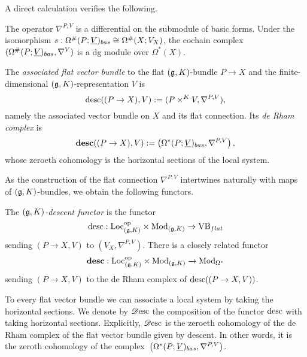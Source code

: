 A direct calculation verifies the following. 

\begin{lemma} 
The operator $\nabla^{P,V}$ is a differential on the submodule of basic forms.
Under the isomorphism $s: \Omega^{\#}(P; \underline{V})_{bas} \cong \Omega^{\#}(X;
V_X)$, the cochain complex $(\Omega^{\#}(P; \underline{V})_{bas}, \nabla^V)$ is a
dg module over $\Omega^*(X)$. 
\end{lemma}


\begin{dfn}\label{def desc}
The {\em associated flat vector bundle} to the flat $(\mathfrak g,K)$-bundle $P \to X$ and the finite-dimensional $(\mathfrak g,K)$-representation $V$ is 
\[
{\rm desc}((P\to X),V) := (P \times^K V, \nabla^{P,V}),
\]
namely the associated vector bundle on $X$ and its flat connection.
Its {\em de Rham complex} is
\[
\mathbf{desc}((P \to X), V) := \left(\Omega^*(P; \underline{V})_{bas}, \nabla^{P,V}\right),
\]
whose zeroeth cohomology is the horizontal sections of the local system.
\end{dfn}

As the construction of the flat connection $\nabla^{P,V}$ intertwines naturally with maps of $(\mathfrak g,K)$-bundles, 
we obtain the following functors.

\begin{dfn}
The {\em $(\mathfrak g,K)$-descent functor} is the functor 
\[
{\rm desc}: {\rm Loc}_{(\mathfrak g,K)}^{{\rm op}} \times {\rm Mod}_{(\mathfrak g,K)} \to {\rm VB}_{flat}
\]
sending $(P \to X, V)$ to $(V_X,\nabla^{P,V})$.
There is a closely related functor
\[
\mathbf{desc}: {\rm Loc}_{(\mathfrak g,K)}^{{\rm op}} \times {\rm Mod}_{(\mathfrak g,K)} \to {\rm Mod}_{\Omega^*}
\]
sending $(P \to X, V)$ to the de Rham complex of ${\rm desc}((P \to X,V))$. 
\end{dfn}

To every flat vector bundle we can associate a local system by taking
the horizontal sections. We denote by $\mathscr{D}{\rm esc}$ the
composition of the functor ${\rm desc}$ with taking horizontal
sections. Explicitly, $\mathscr{D}{\rm esc}$ is the zeroeth cohomology of the de
Rham complex of the flat vector bundle given by descent. In other words, it is
the zeroth cohomology of the complex~$\left(\Omega^*(P;  \underline{V})_{bas}, \nabla^{P,V}\right)$.

